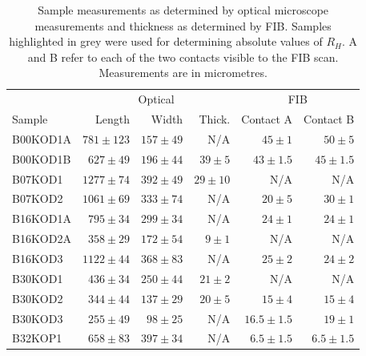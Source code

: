 \begin{table}
    \begin{center}
           \caption{Sample measurements as determined by optical microscope measurements and thickness as determined by \ac{FIB}. Samples highlighted in grey were used for determining absolute values of $R_H$. A and B refer to each of the two contacts visible to the \acs{FIB} scan. Measurements are in micrometres.}
        \begin{tabular}[htbp]{lrrrrr}
\toprule
	& \multicolumn{3}{c}{Optical}			& \multicolumn{2}{c}{\acs{FIB}}		\\
Sample  & Length	& Width		& Thick.	& Contact A    & Contact B    		\\

\midrule
\cellcolor[gray]{0.9}B00KOD1A	& \cellcolor[gray]{0.9}$781\pm123$	& \cellcolor[gray]{0.9}$157\pm49$	& \cellcolor[gray]{0.9}N/A		& \cellcolor[gray]{0.9}$45\pm1$	& \cellcolor[gray]{0.9}$50\pm5$	\\
B00KOD1B	& $627\pm49$	& $196\pm44$	& $39\pm5$ 	& $43\pm1.5$	& $45\pm1.5$	\\
B07KOD1		& $1277\pm74$	& $392\pm49$	& $29\pm10$	& N/A		& N/A		\\
\cellcolor[gray]{0.9}B07KOD2		& \cellcolor[gray]{0.9}$1061\pm69$	& \cellcolor[gray]{0.9}$333\pm74$	& \cellcolor[gray]{0.9}N/A		& \cellcolor[gray]{0.9}$20\pm5$ 	& \cellcolor[gray]{0.9}$30\pm1$ 	\\
\cellcolor[gray]{0.9}B16KOD1A	& \cellcolor[gray]{0.9}$795\pm34$	& \cellcolor[gray]{0.9}$299\pm34$	& \cellcolor[gray]{0.9}N/A		& \cellcolor[gray]{0.9}$24\pm1$ 	& \cellcolor[gray]{0.9}$24\pm1$ 	\\
B16KOD2A	& $358\pm29$	& $172\pm54$	& $9\pm1$ 	& N/A		& N/A		\\
B16KOD3		& $1122\pm44$	& $368\pm83$	& N/A		& $25\pm2$ 	& $24\pm2$ 	\\
B30KOD1	 	& $436\pm34$	& $250\pm44$	& $21\pm2$ 	& N/A		& N/A		\\
B30KOD2		& $344\pm44$	& $137\pm29$	& $20\pm5$ 	& $15\pm4$	& $15\pm4$	\\
\cellcolor[gray]{0.9}B30KOD3 	& \cellcolor[gray]{0.9}$255\pm49$	& \cellcolor[gray]{0.9}$98\pm25$ 	& \cellcolor[gray]{0.9}N/A		& \cellcolor[gray]{0.9}$16.5\pm1.5$	& \cellcolor[gray]{0.9}$19\pm1$	\\
\cellcolor[gray]{0.9}B32KOP1 	& \cellcolor[gray]{0.9}$658\pm83$	& \cellcolor[gray]{0.9}$397\pm34$	& \cellcolor[gray]{0.9}N/A		& \cellcolor[gray]{0.9}$6.5\pm1.5$	& \cellcolor[gray]{0.9}$6.5\pm1.5$	\\

\end{tabular}
\end{center}
\end{table}
